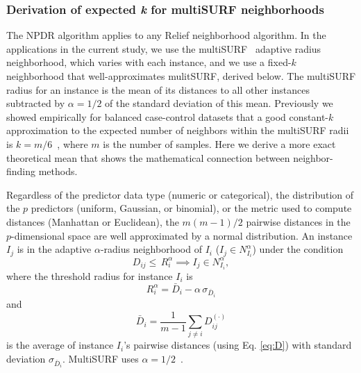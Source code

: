 \documentclass[10pt]{article}
\begin{document}

\subsubsection{Derivation of expected \textit{k} for multiSURF neighborhoods}
The NPDR algorithm applies to any Relief neighborhood algorithm. In the applications in the current study, we use the multiSURF~\cite{urbanowicz17} adaptive radius neighborhood, which varies with each instance, and we use a fixed-$k$ neighborhood that well-approximates mulitSURF, derived below. The multiSURF radius for an instance is the mean of its distances to all other instances subtracted by $\alpha=1/2$ of the standard deviation of this mean. Previously we showed empirically for balanced case-control datasets that a good constant-$k$ approximation to the expected number of neighbors within the multiSURF radii is $k=m/6$~\cite{stir}, where $m$ is the number of samples. Here we derive a more exact theoretical mean that shows the mathematical connection between neighbor-finding methods.

Regardless of the predictor data type (numeric or categorical), the distribution of the $p$ predictors (uniform, Gaussian, or binomial), or the metric used to compute distances (Manhattan or Euclidean), the $m(m-1)/2$ pairwise distances in the $p$-dimensional space are well approximated by a normal distribution. An instance $I_j$ is in the adaptive $\alpha$-radius neighborhood of $I_i$ ($I_j \in N^{\alpha}_{I_i}$) under the condition
%
%
\begin{equation}
D_{ij} \le \, R_i^{\alpha} \implies I_j \in N^{\alpha}_{I_i},
\end{equation}
where the threshold radius for instance $I_i$ is
\begin{equation} 
R_i^{\alpha} =  \bar{D}_i - \alpha \, \sigma_{\bar{D}_i}
\end{equation}
and 
\begin{equation}
\bar{D}_i = \frac{1}{m-1} \sum_{j \ne i} D^{(\cdot)}_{ij}
\end{equation}
is the average of instance $I_i$'s pairwise distances (using Eq. \ref{eq:D}) with standard deviation $\sigma_{\bar{D}_i}$. MultiSURF uses $\alpha=1/2$~\cite{msurf13}. 
 
\end{document}
